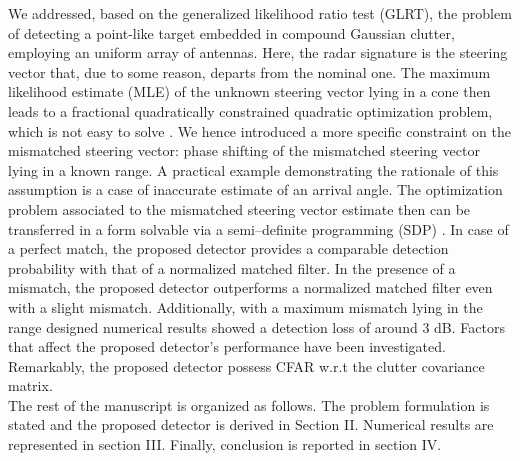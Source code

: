  We addressed, based on the generalized likelihood ratio test (GLRT),
 the problem of detecting
 a point-like target 
 embedded in compound Gaussian clutter,
  employing
 an uniform array of antennas.
 Here, the radar signature is the steering vector that, due to some reason,
 departs from the nominal one.
 The maximum likelihood estimate (MLE) of the
 unknown steering vector lying in a cone 
 then leads to
  a fractional quadratically constrained quadratic optimization problem,
 which is not easy to solve \cite{DeMaio11}.
We hence introduced a more specific constraint on the mismatched steering vector:
phase shifting %
 of the mismatched steering vector lying in a known range.
 A practical example demonstrating the rationale of this assumption is
 a case of inaccurate estimate of an arrival angle.
 The optimization problem associated to the mismatched steering vector estimate
then can be transferred in a form
solvable via a semi--definite programming (SDP) \cite{Roh06}.
In case of a perfect match, %
the proposed detector provides a comparable detection probability with
that of a normalized matched filter. %
In the presence of a mismatch, %
the proposed detector outperforms a normalized matched filter
even with a slight
mismatch. Additionally, 
with a maximum mismatch lying in the range designed 
numerical results showed a
detection loss of around $3$ dB.
Factors that affect the proposed detector's performance have been investigated.
Remarkably, the proposed detector
possess CFAR w.r.t the clutter covariance matrix.\\
\indent The rest of the manuscript is organized as follows.
The problem formulation is stated and the proposed detector is derived in Section II.
Numerical results are represented in section III. Finally, conclusion is reported in section IV. \\
